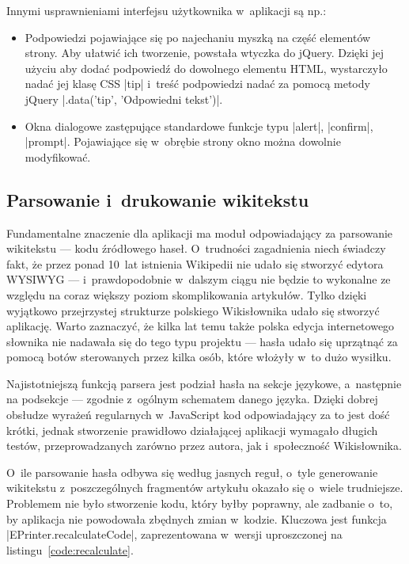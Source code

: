 Innymi usprawnieniami interfejsu użytkownika w~aplikacji są np.:
\begin{itemize}
\item Podpowiedzi pojawiające się po najechaniu myszką na część elementów strony. Aby ułatwić ich tworzenie, powstała wtyczka do jQuery. Dzięki jej użyciu aby dodać podpowiedź do dowolnego elementu HTML, wystarczyło nadać jej klasę CSS \kod|tip| i~treść podpowiedzi nadać za pomocą metody jQuery \kod|.data('tip', 'Odpowiedni tekst')|.
\item Okna dialogowe zastępujące standardowe funkcje typu \kod|alert|, \kod|confirm|, \kod|prompt|. Pojawiające się w~obrębie strony okno można dowolnie modyfikować.
\end{itemize}

\subsection{Parsowanie i~drukowanie wikitekstu}
\label{impl:parser}
Fundamentalne znaczenie dla aplikacji ma moduł odpowiadający za parsowanie wikitekstu --- kodu źródłowego haseł. O~trudności zagadnienia niech świadczy fakt, że przez ponad 10~lat istnienia Wikipedii nie udało się stworzyć edytora WYSIWYG --- i~prawdopodobnie w~dalszym ciągu nie będzie to wykonalne ze względu na coraz większy poziom skomplikowania artykułów. Tylko dzięki wyjątkowo przejrzystej strukturze polskiego Wikisłownika udało się stworzyć aplikację. Warto zaznaczyć, że kilka lat temu także polska edycja internetowego słownika nie nadawała się do tego typu projektu --- hasła udało się uprzątnąć za pomocą botów sterowanych przez kilka osób, które włożyły w~to dużo wysiłku.

Najistotniejszą funkcją parsera jest podział hasła na sekcje językowe, a~następnie na podsekcje --- zgodnie z~ogólnym schematem danego języka. Dzięki dobrej obsłudze wyrażeń regularnych w~JavaScript kod odpowiadający za to jest dość krótki, jednak stworzenie prawidłowo działającej aplikacji wymagało długich testów, przeprowadzanych zarówno przez autora, jak i~społeczność Wikisłownika.

O~ile parsowanie hasła odbywa się według jasnych reguł, o~tyle generowanie wikitekstu z~poszczególnych fragmentów artykułu okazało się o~wiele trudniejsze. Problemem nie było stworzenie kodu, który byłby poprawny, ale zadbanie o~to, by aplikacja nie powodowała zbędnych zmian w~kodzie. Kluczowa jest funkcja \kod|EPrinter.recalculateCode|, zaprezentowana w~wersji uproszczonej na listingu~\ref{code:recalculate}.


